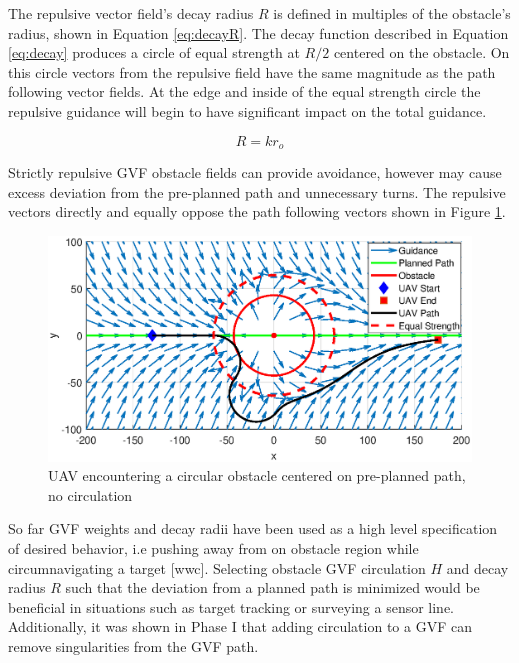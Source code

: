\documentclass[numbered,pdftex]{ohio-etd}
\begin{document}
 The repulsive vector field's decay radius $R$ is defined in multiples of the obstacle's radius, shown in Equation \ref{eq:decayR}. The decay function described in Equation \ref{eq:decay} produces a circle of equal strength at $R/2$ centered on the obstacle. On this circle vectors from the repulsive field have the same magnitude as the path following vector fields. At the edge and inside of the equal strength circle the repulsive guidance will begin to have significant impact on the total guidance. 
 
 \begin{equation}
 \label{eq:decayR}
 R = k r_o
 \end{equation}
 
 Strictly repulsive GVF obstacle fields can provide avoidance, however may cause excess deviation from the pre-planned path and unnecessary turns. The repulsive vectors directly and equally oppose the path following vectors shown in Figure \ref{fig:uavPathObstNoCirc}. 

\begin{figure}[H]
	\centering
	\includegraphics[trim=0 100 0 125,clip,width=14cm]{PaperFigures/Methods/uavPathFollowObstacleNoCirc}
	\caption{UAV encountering a circular obstacle centered on pre-planned path, no circulation}
	\label{fig:uavPathObstNoCirc}
\end{figure}


So far GVF weights and decay radii have been used as a high level specification of desired behavior, i.e pushing away from on obstacle region while circumnavigating a target [wwc]. Selecting obstacle GVF circulation $H$ and decay radius $R$ such that the deviation from a planned path is minimized would be beneficial in situations such as target tracking or surveying a sensor line. Additionally, it was shown in Phase I that adding circulation to a GVF can remove singularities from the GVF path. 
\end{document}
